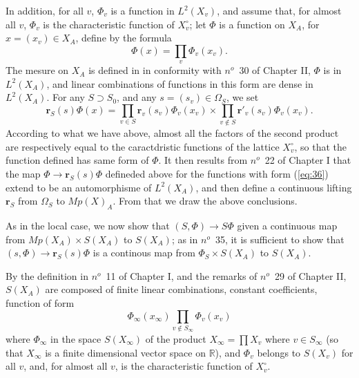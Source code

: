 \documentclass[12pt]{amsart}
\def\bR{{\mathbb{R}}}
\def\br{{\mathbf{r}}}
\newcounter{ssection}
\renewcommand{\subsection}{
  \addtocounter{ssection}{1}{\bf  \arabic{ssection}.\  }}
\begin{document}
In addition, for all $v$, $\Phi_v$ is a function in  $L^2(X_v)$,
and assume that, for almost all $v$, $\Phi_v$ 
is the characteristic function of $X_v^\circ$; let $\Phi$ is a function on $X_A$,
for $x=(x_v)\in X_A$, define by the formula
\begin{equation}\label{eq:36}
\Phi(x) = \prod_v \Phi_v(x_v).
\end{equation}
The mesure on $X_A$ is defined in in conformity with $n^o$~30 of Chapter II,
$\Phi$ is in $L^2(X_A)$, and linear combinations of  functions in this 
form are dense in $L^2(X_A)$.
For any $S\supset S_0$, and any $s=(s_v)\in \Omega_S$, we set
\[
\br_S(s)\Phi(x) = \prod_{v\in S} \br_v(s_v)\Phi_v(x_v) 
\times \prod_{v\notin S} \br'_v(s_v)\Phi_v(x_v).
\]
According to what we have above,
almost all the factors of the second product are
respectively equal to the caractdristic functions of the lattice $X_v^\circ$,
so that the function defined has same form of $\Phi$.
It then results from $n^o$~22 of Chapter I that 
the map $\Phi\to \br_S(s)\Phi$ defineded above for the functions 
with form (\ref{eq:36}) extend to be an automorphisme of $L^2(X_A)$, and 
then define a continuous lifting $\br_S$ from $\Omega_S$ to $Mp(X)_A$.
From that we draw the above conclusions.  

\subsection{}
As in the local case, we now show that $(S, \Phi)\to S\Phi$ given 
a continuous map from $Mp(X_A)\times S(X_A)$ to $S(X_A)$;
as in $n^o$~35, it is sufficient to show that $(s,\Phi) \to \br_S(s) \Phi$ 
is a continous map from $\Phi_S\times S(X_A)$ to $S(X_A)$. 

By the definition in $n^o$~11 of Chapter I, and the remarks of $n^o$~29 of 
Chapter II, $S(X_A)$ are composed of finite linear combinations,
 constant coefficients, function of form
\begin{equation}\label{eq:37}
\Phi_\infty(x_\infty) \prod_{v\notin S_\infty}\Phi_v(x_v)
\end{equation} 
where $\Phi_\infty$ in the space $S(X_\infty)$ of the product $X_\infty =\prod X_v$
where $v\in S_\infty$ (so that $X_\infty$ is a finite dimensional 
vector space on $\bR$), and  $\Phi_v$ belongs to  $S(X_v)$ for all $v$,
and, for almost all $v$, is the characteristic function of $X_v^\circ$.
\end{document}
